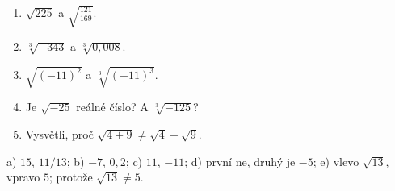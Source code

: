 \documentclass[11pt,a4paper]{article}
\begin{document}
\begin{zadaniReseniBox}[title={Domácí úkol}]
\begin{enumerate}[label=\alph*)]
\item $\sqrt{225}$ a $\sqrt{\frac{121}{169}}$.
\item $\sqrt[3]{-343}$ a $\sqrt[3]{0{,}008}$.
\item $\sqrt{(-11)^2}$ a $\sqrt[3]{(-11)^3}$.
\item Je $\sqrt{-25}$ reálné číslo? A $\sqrt[3]{-125}$?
\item Vysvětli, proč $\sqrt{4+9}\ne\sqrt4+\sqrt9$.
\end{enumerate}
\tcblower
 a) $15$, $11/13$; b) $-7$, $0{,}2$;
 c) $11$, $-11$; d) první ne, druhý je $-5$;
 e) vlevo $\sqrt{13}$, vpravo $5$; protože $\sqrt{13}\ne5$.
\end{zadaniReseniBox}
\end{document}
